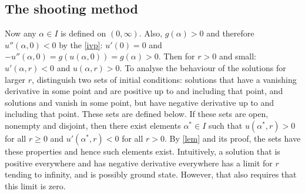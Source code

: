 \subsection{The shooting method}\hfill

Now any $\alpha\in I$ is defined on $(0,\infty)$. Also, $g(\alpha)>0$ and therefore $u''(\alpha,0)<0$ by the \eqref{ivp}: $u'(0)=0$ and $-u''(\alpha,0)=g(u(\alpha,0))=g(\alpha)>0$. Then for $r>0$ and small: $u'(\alpha,r)<0$ and $u(\alpha,r)>0$. To analyse the behaviour of the solutions for larger $r$, distinguish two sets of initial conditions: solutions that have a vanishing derivative in some point and are positive up to and including that point, and solutions and vanish in some point, but have negative derivative up to and including that point. {\color{red}These sets are defined below.} If these sets are open, nonempty and disjoint, then there exist elements $\alpha^*\in I$ such that $u(\alpha^*,r)>0$ for all $r\geq0$ and $u'(\alpha^*,r)<0$ for all $r>0$. By \cref{lem} and its proof, the sets have these properties and hence such elements exist. Intuitively, a solution that is positive everywhere and has negative derivative everywhere has a limit for $r$ tending to infinity, and is possibly ground state. However, that also requires that this limit is zero.

